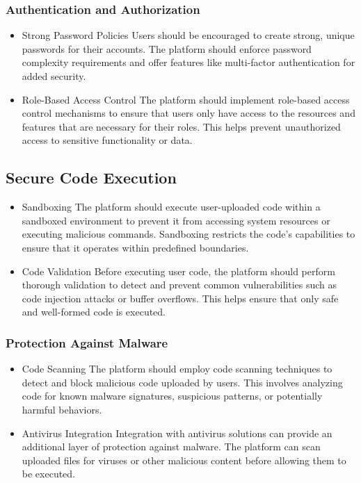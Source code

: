 \subsubsection{Authentication and Authorization}

\begin{itemize}
	\item{Strong Password Policies}
	Users should be encouraged to create strong, unique passwords for their accounts. The 	platform should enforce password complexity requirements and offer features like multi-factor authentication for added security.
	
	\item{Role-Based Access Control}
	The platform should implement role-based access control mechanisms to ensure that users only have access to the resources and features that are necessary for their roles. This helps prevent unauthorized access to sensitive functionality or data.
	
\end{itemize}

\subsection{Secure Code Execution}

\begin{itemize}
	\item {Sandboxing}
	The platform should execute user-uploaded code within a sandboxed environment to prevent it from accessing system resources or executing malicious commands. Sandboxing restricts the code's capabilities to ensure that it operates within predefined boundaries.
	\item {Code Validation}
	Before executing user code, the platform should perform thorough validation to detect and prevent common vulnerabilities such as code injection attacks or buffer overflows. This helps ensure that only safe and well-formed code is executed.
\end{itemize}

\subsubsection{Protection Against Malware}

\begin{itemize}
	\item {Code Scanning}
	The platform should employ code scanning techniques to detect and block malicious code uploaded by users. This involves analyzing code for known malware signatures, suspicious patterns, or potentially harmful behaviors.
	\item {Antivirus Integration}
	Integration with antivirus solutions can provide an additional layer of protection against malware. The platform can scan uploaded files for viruses or other malicious content before allowing them to be executed.
\end{itemize}



